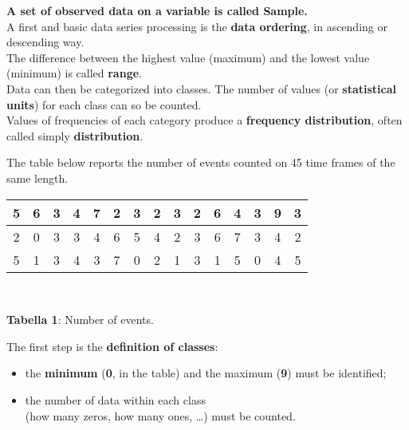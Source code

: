 \begin{frame}
  \vspace*{.75cm}
  \begin{small}
    \textbf{A set of observed data on a variable is called \textbf{Sample}.} \\
    \vspace*{.5cm}
    A first and basic data series processing is the \textbf{data ordering}, in ascending or descending way.\\
    \vspace*{.5cm}
    The difference between the highest value (maximum) and the lowest value (minimum) is called \textbf{range}.\\
    \vspace*{.5cm}
    Data can then be categorized into classes. The number of values (or \textbf{statistical units}) for each class can so be counted.\\
    \vspace*{.5cm}
    Values of frequencies of each category produce a \textbf{frequency distribution}, often called simply \textbf{distribution}.\\
  \end{small}
\end{frame}

\begin{frame}
  The table below reports the number of events counted on 45 time frames of the same length.
  \vspace*{.25cm}
  \begin{center}
    \begin{tabular}{|*{15}{c|}}
      \hline
      5 & 6 & 3 & 4 & 7 & 2 & 3 & 2 & 3 & 2 & 6 & 4 & 3 & 9 & 3 \\
      \hline
      2 & 0 & 3 & 3 & 4 & 6 & 5 & 4 & 2 & 3 & 6 & 7 & 3 & 4 & 2 \\
      \hline
      5 & 1 & 3 & 4 & 3 & 7 & 0 & 2 & 1 & 3 & 1 & 5 & 0 & 4 & 5 \\
      \hline
    \end{tabular}\\
    \vspace*{.2cm}
    \begin{scriptsize}
      \textbf{Tabella 1}: Number of events.
    \end{scriptsize}
  \end{center}
  The first step is the \textbf{definition of classes}:
  \vspace*{.25cm}
  \begin{itemize}
    \item the \textbf{minimum} (\textbf{0}, in the table) and the maximum (\textbf{9}) must be identified;
    \vspace*{.25cm}
    \item the number of data within each class\\ \small (how many zeros, how many ones, \dots) must be counted.
  \end{itemize}
\end{frame}

